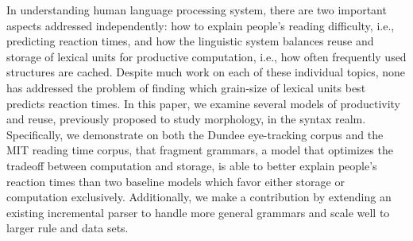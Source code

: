 In understanding human language processing system, there are two important aspects addressed independently: how to explain people's reading difficulty, i.e., predicting reaction times, and how the linguistic system balances reuse and storage of lexical units for productive computation, i.e., how often frequently used structures are cached. Despite much work on each of these individual topics, none has addressed the problem of finding which grain-size of lexical units best predicts reaction times. In this paper, we examine several models of productivity and reuse, previously proposed to study morphology, in the syntax realm. Specifically, we demonstrate on both the Dundee eye-tracking corpus and the MIT reading time corpus, that fragment grammars, a model that optimizes the tradeoff between computation and storage, is able to better explain people's reaction times than two baseline models which favor either storage or computation exclusively. Additionally, we make a contribution by extending an existing incremental parser to handle more general grammars and scale well to larger rule and data sets.
